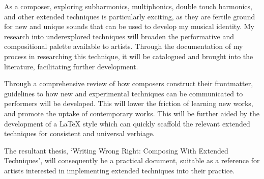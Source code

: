 As a composer, exploring subharmonics, multiphonics, double touch harmonics, and other extended techniques is particularly exciting, as they are fertile ground for new and unique sounds that can be used to develop my musical identity.
My research into underexplored techniques will broaden the performative and compositional palette available to artists. 
Through the documentation of my process in researching this technique, it will be catalogued and brought into the literature, facilitating further development.


Through a comprehensive review of how composers construct their frontmatter, guidelines to how new and experimental techniques can be communicated to performers will be developed.
This will lower the friction of learning new works, and promote the uptake of contemporary works.
This will be further aided by the development of a \LaTeX{} style which can quickly scaffold the relevant extended techniques for consistent and universal verbiage.

The resultant thesis, `Writing Wrong Right: Composing With Extended Techniques', will consequently be a practical document, suitable as a reference for artists interested in implementing extended techniques into their practice.

